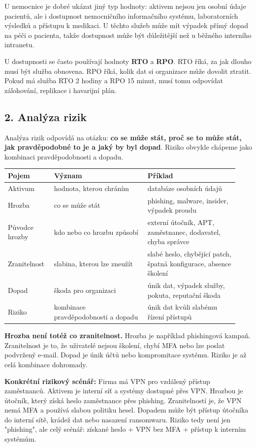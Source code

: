 \documentclass[11pt,a4paper]{article}
\newcommand{\itpr}[1]{\medskip\noindent\colorbox{green!8}{\parbox{\dimexpr\linewidth-2\fboxsep}{#1}}\medskip}
\begin{document}
U nemocnice je dobré ukázat jiný typ hodnoty: aktivem nejsou jen osobní údaje pacientů, ale i dostupnost nemocničního informačního systému, laboratorních výsledků a přístupu k medikaci. U těchto služeb může mít výpadek přímý dopad na péči o pacienta, takže dostupnost může být důležitější než u běžného interního intranetu.

U dostupnosti se často používají hodnoty \textbf{RTO} a \textbf{RPO}. RTO říká, za jak dlouho musí být služba obnovena. RPO říká, kolik dat si organizace může dovolit ztratit. Pokud má služba RTO 2 hodiny a RPO 15 minut, musí tomu odpovídat zálohování, replikace i havarijní plán.

\subsection*{2. Analýza rizik}

Analýza rizik odpovídá na otázku: \textbf{co se může stát, proč se to může stát, jak pravděpodobné to je a jaký by byl dopad}. Riziko obvykle chápeme jako kombinaci pravděpodobnosti a dopadu.

\begin{longtable}{p{0.18\linewidth}p{0.38\linewidth}p{0.37\linewidth}}
\toprule
\textbf{Pojem} & \textbf{Význam} & \textbf{Příklad} \\
\midrule\endhead
Aktivum & hodnota, kterou chráním & databáze osobních údajů \\
Hrozba & co se může stát & phishing, malware, insider, výpadek proudu \\
Původce hrozby & kdo nebo co hrozbu způsobí & externí útočník, APT, zaměstnanec, dodavatel, chyba správce \\
Zranitelnost & slabina, kterou lze zneužít & slabé heslo, chybějící patch, špatná konfigurace, absence školení \\
Dopad & škoda pro organizaci & únik dat, výpadek služby, pokuta, reputační škoda \\
Riziko & kombinace pravděpodobnosti a dopadu & únik dat kvůli slabému řízení přístupů \\
\bottomrule
\end{longtable}

\textbf{Hrozba není totéž co zranitelnost.} Hrozba je například phishingová kampaň. Zranitelnost je to, že uživatelé nejsou školení, chybí MFA nebo lze poslat podvržený e-mail. Dopad je únik účtů nebo kompromitace systému. Riziko je až celá kombinace dohromady.

\itpr{\textbf{Konkrétní rizikový scénář:} Firma má VPN pro vzdálený přístup zaměstnanců. Aktivem je interní síť a systémy dostupné přes VPN. Hrozbou je útočník, který získá heslo zaměstnance přes phishing. Zranitelností je, že VPN nemá MFA a používá slabou politiku hesel. Dopadem může být přístup útočníka do interní sítě, krádež dat nebo nasazení ransomwaru. Riziko tedy není jen "phishing", ale celý scénář: získané heslo + VPN bez MFA + přístup k interním systémům.}
\end{document}
